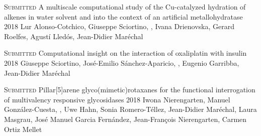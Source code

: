 \begin{cventries}
  \pubentry
    {\scshape{Submitted}} %
    {A multiscale computational study of the Cu-catalyzed hydration of alkenes in water solvent and into the context of an artificial metallohydratase} %
    {2018} %
    {} %
    {Lur Alonso-Cotchico, Giuseppe Sciortino, , Ivana Drienovska, Gerard Roelfes, Agustí Lledós, Jean-Didier Maréchal} %
    {} %
    {} %

  \pubentry
    {\scshape{Submitted}} %
    {Computational insight on the interaction of oxaliplatin with insulin} %
    {2018} %
    {} %
    {Giuseppe Sciortino, José-Emilio Sánchez-Aparicio, , Eugenio Garribba, Jean-Didier Maréchal} %
    {} %
    {} %

  \pubentry
    {\scshape{Submitted}} %
    {Pillar[5]arene glyco(mimetic)rotaxanes for the functional interrogation of multivalency responsive glycosidases} %
    {2018} %
    {} %
    {Iwona Nierengarten, Manuel González-Cuesta, , Uwe Hahn, Sonia Romero-Téllez, Jean-Didier Maréchal, Laura Masgrau, José Manuel Garcia Fernández, Jean-François Nierengarten, Carmen Ortiz Mellet} %
    {} %
    {} %

\end{cventries}


